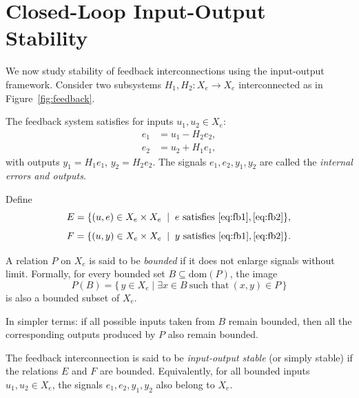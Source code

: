 \section{Closed-Loop Input-Output Stability}

We now study stability of feedback interconnections using the input-output framework.  
Consider two subsystems $H_1, H_2 : X_e \to X_e$ interconnected as in Figure~\ref{fig:feedback}.

\begin{definition}
The feedback system satisfies for inputs $u_1,u_2 \in X_e$:
\begin{align}
e_1 &= u_1 - H_2 e_2, \label{eq:fb1}\\
e_2 &= u_2 + H_1 e_1, \label{eq:fb2}
\end{align}
with outputs $y_1 = H_1 e_1$, $y_2 = H_2 e_2$.  
The signals $e_1,e_2,y_1,y_2$ are called the \emph{internal errors and outputs}.
\end{definition}

\begin{definition}
Define
\begin{equation}
E = \{ (u,e) \in X_e \times X_e \;\mid\; e \text{ satisfies } \eqref{eq:fb1}, \eqref{eq:fb2}\},
\end{equation}
\begin{equation}
F = \{ (u,y) \in X_e \times X_e \;\mid\; y \text{ satisfies } \eqref{eq:fb1}, \eqref{eq:fb2}\}.
\end{equation}
\end{definition}

\begin{definition}[Boundedness]
A relation $P$ on $X_e$ is said to be \emph{bounded} if it does not enlarge signals without limit.  
Formally, for every bounded set $B \subseteq \mathrm{dom}(P)$, the image
\[
P(B) = \{\, y \in X_e \mid \exists x \in B \ \text{such that}\ (x,y) \in P \,\}
\]
is also a bounded subset of $X_e$.

In simpler terms: if all possible inputs taken from $B$ remain bounded, then all the corresponding outputs produced by $P$ also remain bounded.
\end{definition}

\begin{definition}
The feedback interconnection is said to be \emph{input-output stable} (or simply stable) if the relations $E$ and $F$ are bounded.  
Equivalently, for all bounded inputs $u_1,u_2 \in X_e$, the signals $e_1,e_2,y_1,y_2$ also belong to $X_e$.
\end{definition}

